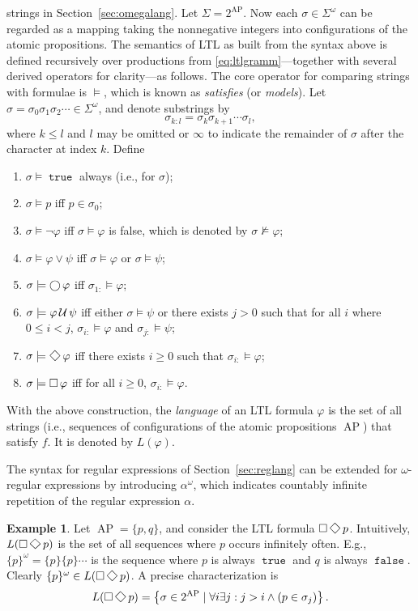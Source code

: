 \documentclass{amsart}
\DeclareMathOperator{\ap}{AP}
\DeclareMathOperator{\true}{\mathtt{true}}
\DeclareMathOperator{\false}{\mathtt{false}}
\theoremstyle{plain}
\theoremstyle{definition}
\theoremstyle{definition}
\newtheorem{examp}{Example}
\begin{document}
strings in Section~\ref{sec:omegalang}.  Let $\Sigma=2^{\ap}$.  Now each
$\sigma\in \Sigma^{\omega}$ can be regarded as a mapping taking the nonnegative
integers into configurations of the atomic propositions.  The semantics of LTL
as built from the syntax above is defined recursively over productions from
\eqref{eq:ltlgramm}---together with several derived operators for clarity---as
follows.  The core operator for comparing strings with formulae is $\models$,
which is known as \textit{satisfies} (or \textit{models}).  Let $\sigma=\sigma_0
\sigma_1 \sigma_2 \cdots \in \Sigma^{\omega}$, and denote substrings by
\[
\sigma_{k:l} = \sigma_{k}\sigma_{k+1}\cdots\sigma_{l} ,
\]
where $k\leq l$ and $l$ may be omitted or $\infty$ to indicate the remainder of
$\sigma$ after the character at index $k$.  Define
\begin{enumerate}
\item $\sigma \models \true$ always (i.e., for $\sigma$);
\item $\sigma \models p$ iff $p\in \sigma_0$;
\item $\sigma \models \neg \varphi$ iff $\sigma\models\varphi$ is false, which is denoted by $\sigma \not\models \varphi$;
\item $\sigma \models \varphi \vee \psi$ iff $\sigma \models \varphi$ or $\sigma \models \psi$;
\item $\sigma \models \operatorname{\bigcirc} \varphi$ iff $\sigma_{1:} \models \varphi$;
\item $\sigma \models \varphi\operatorname{\mathcal{U}} \psi$ iff either $\sigma\models\psi$ or there exists $j > 0$ such that for all $i$ where $0\leq i<j$, $\sigma_{i:}\models \varphi$ and $\sigma_{j:}\models \psi$;
\item $\sigma \models \Feventually \varphi$ iff there exists $i\geq0$ such that $\sigma_{i:}\models \varphi$;
\item $\sigma \models \operatorname{\Box} \varphi$ iff for all $i\geq0$, $\sigma_{i:}\models \varphi$.
\end{enumerate}
With the above construction, the \textit{language} of an LTL formula $\varphi$
is the set of all strings (i.e., sequences of configurations of the atomic
propositions $\ap$) that satisfy $f$.  It is denoted by $L(\varphi)$.

The syntax for regular expressions of Section~\ref{sec:reglang} can be extended
for $\omega$-regular expressions by introducing $\alpha^{\omega}$, which
indicates countably infinite repetition of the regular expression $\alpha$.
\begin{examp}
Let $\ap=\{ p, q\}$, and consider the LTL formula $\Galways\Feventually p$.  Intuitively,
$L(\Galways\Feventually p)$ is the set of all sequences where $p$ occurs infinitely often.
E.g., $\{p\}^{\omega}=\{p\}\{p\}\cdots$ is the sequence where $p$ is always
$\true$ and $q$ is always $\false$.  Clearly $\{p\}^{\omega}\in L(\Galways\Feventually p)$.
A precise characterization is
\[
L(\Galways\Feventually p) = \left\{ \sigma\in 2^{\ap} \mid \forall i \exists j : j > i \wedge \left( p\in\sigma_j \right) \right\} .
\]
\end{examp}
\end{document}
